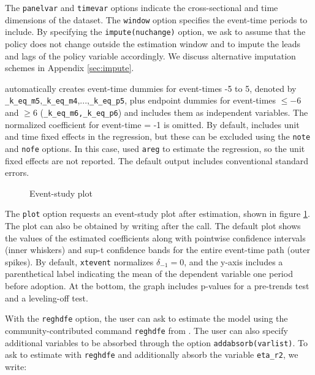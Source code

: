 \documentclass[12pt]{article}
\begin{document}
The \texttt{panelvar} and \texttt{timevar} options indicate the cross-sectional and time dimensions of the dataset.
The \texttt{window} option specifies the event-time periods to include.
By specifying the \texttt{impute(nuchange)} option, we ask \xtevent to assume that the policy does not change outside the estimation window and to impute the leads and lags of the policy variable accordingly.
We discuss alternative imputation schemes in Appendix \ref{sec:impute}.

\xtevent automatically creates event-time dummies for event-times -5 to 5, denoted by \texttt{\_k\_eq\_m5},\texttt{\_k\_eq\_m4},...,\texttt{\_k\_eq\_p5}, plus endpoint dummies for event-times $\leq -6$ and $\geq 6$ (\texttt{\_k\_eq\_m6,\_k\_eq\_p6}) and includes them as independent variables.
The normalized coefficient for event-time = -1 is omitted.
By default, \xtevent includes unit and time fixed effects in the regression, but these can be excluded using the \texttt{note} and \texttt{nofe} options.
In this case, \xtevent used \texttt{areg} to estimate the regression, so the unit fixed effects are not reported.
The default output includes conventional standard errors.

\begin{figure}[h!]
	\begin{center}
	\end{center}
	\caption{Event-study plot}
	\label{fig:graph_from_plot_option}
\end{figure}

The \texttt{plot} option requests an event-study plot after estimation, shown in figure \ref{fig:graph_from_plot_option}.
The plot can also be obtained by writing \xteventplot after the \xtevent call.
The default plot shows the values of the estimated coefficients along with pointwise confidence intervals (inner whiskers) and sup-t confidence bands for the entire event-time path (outer spikes).
By default, \texttt{xtevent} normalizes $\delta_{-1}=0$, and the y-axis includes a parenthetical label indicating the mean of the dependent variable one period before adoption.
At the bottom, the graph includes p-values for a pre-trends test and a leveling-off test.

With the \texttt{reghdfe} option, the user can ask \xtevent to estimate the model using the community-contributed command \texttt{reghdfe} from \cite{Correia2017:HDFE}.
The user can also specify additional variables to be absorbed through the option \texttt{addabsorb(varlist)}.
To ask \xtevent to estimate with \texttt{reghdfe} and additionally absorb the variable \texttt{eta\_r2}, we write:
\end{document}
